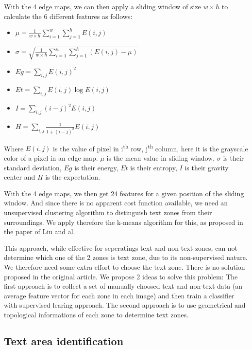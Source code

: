 \documentclass[paper=a4, french, 11pt]{scrartcl}
\begin{document}
With the 4 edge maps, we can then apply a sliding window of size $w \times h$ to calculate the 6 different features as follows:

\begin{itemize}
\item $\mu = \frac{1}{w \times h} \sum_{i=1}^{w} \sum_{j=1}^{h} E(i,j)$

\item $\sigma =\sqrt{\frac{1}{w \times h} \sum_{i=1}^{w} \sum_{j=1}^{h} (E(i,j) - \mu)}$

\item $ Eg = \sum_{i,j}E(i,j)^2 $

\item $ Et = \sum_{i,j} E(i,j)\log E(i,j) $

\item $ I = \sum_{i,j} (i-j)^2 E(i,j)$

\item $ H = \sum_{i,j} \frac{1}{1+(i-j)^2}E(i,j)$
\end{itemize}

Where $E(i,j)$ is the value of pixel in i\textsuperscript{th} row, j\textsuperscript{th} column, here it is the grayscale color of a pixel in an edge map. $\mu$ is the mean value in sliding window, $\sigma$ is their standard deviation, $ Eg$ is their energy, $ Et$ is their entropy, $ I$  is their gravity center and $ H$ is the expectation.

With the 4 edge maps, we then get 24 features for a given position of the sliding window. And since there is no apparent cost function available, we need an unsupervised clustering algorithm to distinguish text zones from their surroundings. We apply therefore the k-means algorithm for this, as proposed in the paper of Liu and al.

This approach, while effective for seperatings text and non-text zones, can not determine which one of the 2 zones is text zone, due to its non-supervised nature. We therefore need some extra effort to choose the text zone. There is no solution proposed in the original article. We propose 2 ideas to solve this problem: The first approach is to collect a set of manually choosed text and non-text data (an average feature vector for each zone in each image) and then train a classifier with supervised learing approach. The second approach is to use geometrical and topological informations of each zone to determine text zones.

\subsection{Text area identification} \mbox{} \vspace{-0.5cm}
\end{document}
